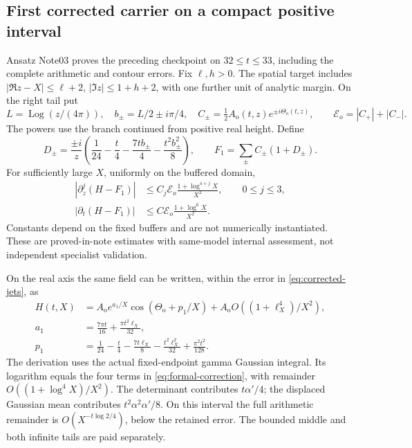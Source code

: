 \documentclass[11pt]{article}
\newcommand{\Log}{\operatorname{Log}}
\numberwithin{equation}{section}
\begin{document}
\subsection{First corrected carrier on a compact positive interval}
Ansatz Note03 \cite{ansatz03} proves the preceding checkpoint on
\(32\le t\le33\), including the complete arithmetic and contour errors.
Fix \(\ell,h>0\). The spatial target includes
\( |\Re z-X|\le\ell+2\), \( |\Im z|\le1+h+2\), with one further
unit of analytic margin. On the right tail put
\[
 L=\Log(z/(4\pi)),\quad b_\pm=L/2\pm i\pi/4,\quad
 C_\pm=\tfrac12 A_{\mathrm o}(t,z)e^{\pm i\Theta_{\mathrm o}(t,z)},
 \qquad \mathcal E_o=|C_+|+|C_-|.
\]
The powers use the branch continued from positive real height. Define
\begin{equation}
 D_\pm=\frac{\pm i}{z}\left(
 \frac1{24}-\frac t4-\frac{7t b_\pm}{4}-\frac{t^2b_\pm^2}{8}\right),
 \qquad F_1=\sum_\pm C_\pm(1+D_\pm).
 \label{eq:corrected-outer}
\end{equation}
For sufficiently large \(X\), uniformly on the buffered domain,
\begin{align}
 |\partial_z^j(H-F_1)|&\le C_j\mathcal E_o
       \frac{1+\log^{4+j}X}{X^2},\qquad 0\le j\le3,
       \label{eq:corrected-jets}\\
 |\partial_t(H-F_1)|&\le C\mathcal E_o
       \frac{1+\log^6X}{X^2}.
       \label{eq:corrected-time}
\end{align}
Constants depend on the fixed buffers and are not numerically
instantiated. These are proved-in-note estimates with same-model
internal assessment, not independent specialist validation.

On the real axis the same field can be written, within the error in
\eqref{eq:corrected-jets}, as
\begin{align}
 H(t,X)&=A_{\mathrm o}e^{a_1/X}
              \cos(\Theta_{\mathrm o}+p_1/X)
              +A_{\mathrm o}O((1+\ell_X^4)/X^2),\\
 a_1&=\frac{7\pi t}{16}+\frac{\pi t^2\ell_X}{32},\\
 p_1&=\frac1{24}-\frac t4-\frac{7t\ell_X}{8}
       -\frac{t^2\ell_X^2}{32}+\frac{\pi^2t^2}{128}.
\end{align}
The derivation uses the actual fixed-endpoint gamma Gaussian integral.
Its logarithm equals the four terms in
\eqref{eq:formal-correction}, with remainder
\(O((1+\log^4X)/X^2)\). The determinant contributes
\(t\alpha'/4\); the displaced Gaussian mean contributes
\(t^2\alpha^2\alpha'/8\). On this interval the full arithmetic
remainder is \(O(X^{-t\log2/4})\), below the retained error.
The bounded middle and both infinite tails are paid separately.
\end{document}
